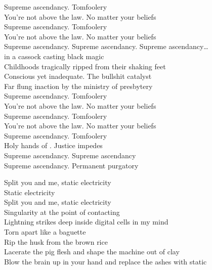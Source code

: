 Supreme ascendancy. Tomfoolery \\
You're not above the law. No matter your beliefs \\
Supreme ascendancy. Tomfoolery \\
You're not above the law. No matter your beliefs \\

Supreme ascendancy. Supreme ascendancy. Supreme ascendancy… \\

 in a cassock casting black magic \\
Childhoods tragically ripped from their shaking feet \\
Conscious yet inadequate. The bullshit catalyst \\
Far flung inaction by the ministry of presbytery \\

Supreme ascendancy. Tomfoolery \\
You're not above the law. No matter your beliefs \\
Supreme ascendancy. Tomfoolery \\
You're not above the law. No matter your beliefs \\
Supreme ascendancy. Tomfoolery \\
Holy hands of . Justice impedes \\

Supreme ascendancy. Supreme ascendancy \\
Supreme ascendancy. Permanent purgatory \\




Split you and me, static electricity \\
Static electricity \\
Split you and me, static electricity \\

Singularity at the point of contacting \\
Lightning strikes deep inside digital cells in my mind \\
Torn apart like a baguette \\
Rip the husk from the brown rice \\
Lacerate the pig flesh and shape the machine out of clay \\
Blow the brain up in your hand and replace the ashes with static \\


